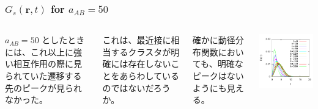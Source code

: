 \documentclass[12pt, dvipdfmx]{beamer}
\begin{document}
\begin{frame}
\frametitle{$G_s(\bm{r}, t)$ for $a_{AB}=50$}

\begin{columns}[T, totalwidth=\linewidth]
 $a_{AB}=50$ としたときには、これ以上に強い相互作用の際に見られていた遷移する先のピークが見られなかった。

これは、最近接に相当するクラスタが明確には存在しないことをあらわしているのではないだろうか。

確かに動径分布関数においても、明確なピークはないようにも見える。

		\includegraphics[width=\columnwidth]{./fig/AB50/Ave_Trj.pdf}
\end{columns}

\end{frame}
\end{document}
